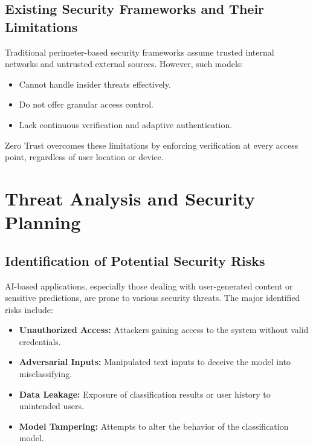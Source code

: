 \documentclass[a4paper,12pt]{article}
\begin{document}
\subsection{Existing Security Frameworks and Their Limitations}
Traditional perimeter-based security frameworks assume trusted internal networks and untrusted external sources. However, such models:
\begin{itemize}
    \item Cannot handle insider threats effectively.
    \item Do not offer granular access control.
    \item Lack continuous verification and adaptive authentication.
\end{itemize}
Zero Trust overcomes these limitations by enforcing verification at every access point, regardless of user location or device.


\section{Threat Analysis and Security Planning}

\subsection{Identification of Potential Security Risks}
AI-based applications, especially those dealing with user-generated content or sensitive predictions, are prone to various security threats. The major identified risks include:
\begin{itemize}
    \item \textbf{Unauthorized Access:} Attackers gaining access to the system without valid credentials.
    \item \textbf{Adversarial Inputs:} Manipulated text inputs to deceive the model into misclassifying.
    \item \textbf{Data Leakage:} Exposure of classification results or user history to unintended users.
    \item \textbf{Model Tampering:} Attempts to alter the behavior of the classification model.
\end{itemize}
\end{document}
